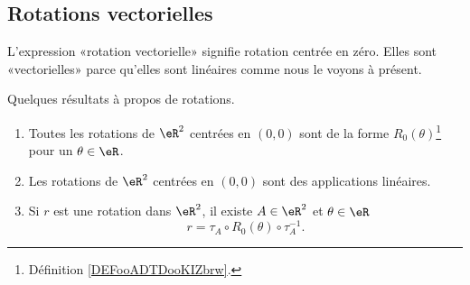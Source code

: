 \subsection{Rotations vectorielles}

L'expression «rotation vectorielle» signifie rotation centrée en zéro. Elles sont «vectorielles» parce qu'elles sont linéaires comme nous le voyons à présent.

\begin{proposition}     \label{PROPooTFNSooFjiWHG}
	Quelques résultats à propos de rotations.
	\begin{enumerate}
		\item       \label{ITEMooONJOooRgycsQ}
		      Toutes les rotations de \( \eR^2\) centrées en \( (0,0)\) sont de la forme \( R_0(\theta)\)\footnote{Définition \ref{DEFooADTDooKIZbrw}.} pour un \( \theta\in \eR\).
		\item       \label{ITEMooMQPRooAbPcrr}
		      Les rotations de \( \eR^2\) centrées en \( (0,0)\) sont des applications linéaires.
		\item       \label{ITEMooSIHZooBEJhdu}
		      Si \( r\) est une rotation dans \( \eR^2\), il existe \( A\in \eR^2\) et \( \theta\in \eR\)
		      \begin{equation}
			      r=\tau_A\circ R_0(\theta)\circ \tau_A^{-1}.
		      \end{equation}
	\end{enumerate}
\end{proposition}

